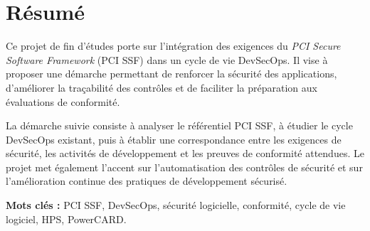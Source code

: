 \chapter*{Résumé}

Ce projet de fin d'études porte sur l'intégration des exigences du \textit{PCI Secure Software Framework} (PCI SSF) dans un cycle de vie DevSecOps. Il vise à proposer une démarche permettant de renforcer la sécurité des applications, d'améliorer la traçabilité des contrôles et de faciliter la préparation aux évaluations de conformité.

La démarche suivie consiste à analyser le référentiel PCI SSF, à étudier le cycle DevSecOps existant, puis à établir une correspondance entre les exigences de sécurité, les activités de développement et les preuves de conformité attendues. Le projet met également l'accent sur l'automatisation des contrôles de sécurité et sur l'amélioration continue des pratiques de développement sécurisé.

\textbf{Mots clés :} PCI SSF, DevSecOps, sécurité logicielle, conformité, cycle de vie logiciel, HPS, PowerCARD.

\clearpage
